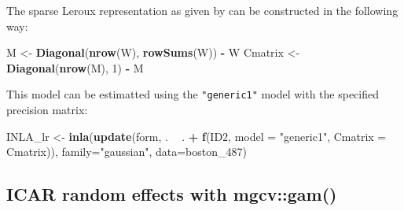 \documentclass[]{book}
\newenvironment{Shaded}{\begin{snugshade}}{\end{snugshade}}
\newcommand{\DataTypeTok}[1]{\textcolor[rgb]{0.13,0.29,0.53}{#1}}
\newcommand{\DecValTok}[1]{\textcolor[rgb]{0.00,0.00,0.81}{#1}}
\newcommand{\KeywordTok}[1]{\textcolor[rgb]{0.13,0.29,0.53}{\textbf{#1}}}
\newcommand{\NormalTok}[1]{#1}
\newcommand{\OperatorTok}[1]{\textcolor[rgb]{0.81,0.36,0.00}{\textbf{#1}}}
\newcommand{\StringTok}[1]{\textcolor[rgb]{0.31,0.60,0.02}{#1}}
\begin{document}
\begin{Shaded}
\end{Shaded}

The sparse Leroux representation as given by \citet{gómez2020bayesian} can be constructed in the following way:

\begin{Shaded}
\begin{Highlighting}[]
\NormalTok{M <-}\StringTok{ }\KeywordTok{Diagonal}\NormalTok{(}\KeywordTok{nrow}\NormalTok{(W), }\KeywordTok{rowSums}\NormalTok{(W)) }\OperatorTok{-}\StringTok{ }\NormalTok{W}
\NormalTok{Cmatrix <-}\StringTok{ }\KeywordTok{Diagonal}\NormalTok{(}\KeywordTok{nrow}\NormalTok{(M), }\DecValTok{1}\NormalTok{) }\OperatorTok{-}\StringTok{  }\NormalTok{M}
\end{Highlighting}
\end{Shaded}

This model can be estimatted using the \texttt{"generic1"} model with the specified precision matrix:

\begin{Shaded}
\begin{Highlighting}[]
\NormalTok{INLA_lr <-}\StringTok{ }\KeywordTok{inla}\NormalTok{(}\KeywordTok{update}\NormalTok{(form, . }\OperatorTok{~}\StringTok{ }\NormalTok{. }\OperatorTok{+}\StringTok{ }\KeywordTok{f}\NormalTok{(ID2, }\DataTypeTok{model =} \StringTok{"generic1"}\NormalTok{, }\DataTypeTok{Cmatrix =}\NormalTok{ Cmatrix)),}
    \DataTypeTok{family=}\StringTok{"gaussian"}\NormalTok{, }\DataTypeTok{data=}\NormalTok{boston_}\DecValTok{487}\NormalTok{)}
\end{Highlighting}
\end{Shaded}

\begin{Shaded}
\end{Shaded}

\hypertarget{icar-random-effects-with-mgcvgam}{%
\subsection{ICAR random effects with mgcv::gam()}\label{icar-random-effects-with-mgcvgam}}
\end{document}
